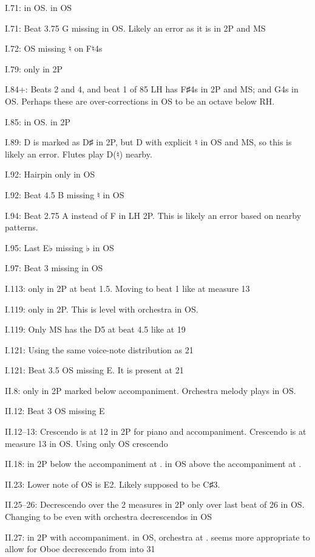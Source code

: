 \documentclass[twoside]{article}
\newcommand\dynmark[1]{\scalebox{0.9}{#1}{\kern1pt}}
\begin{document}
\begin{hangparas}{15pt}{1}
\begin{multicols}{2}
I.71: \dynmark{\p} in OS. \dynmark{\pp} in OS

I.71: Beat 3.75 G missing in OS. Likely an error as it is in 2P and MS

I.72: OS missing ♮ on F♮4s

I.79: \dynmark{\pp} only in 2P

I.84+: Beats 2 and 4, and beat 1 of 85 LH has F♯4s in 2P and MS; and G4s in OS. Perhaps these are over-corrections in OS to be an octave below RH.

I.85: \dynmark{\pp} in OS. \dynmark{\p} in 2P

I.89: D is marked as D♯ in 2P, but D with explicit ♮ in OS and MS, so this is likely an error. Flutes play D(♮) nearby.

I.92: Hairpin only in OS

I.92: Beat 4.5 B missing ♮ in OS

I.94: Beat 2.75 A instead of F in LH 2P. This is likely an error based on nearby patterns.

I.95: Last E♭ missing ♭ in OS

I.97: Beat 3 missing in OS

I.113: \dynmark{\f} only in 2P at beat 1.5. Moving to beat 1 like at measure 13

I.119: \dynmark{\ff} only in 2P. This is level with orchestra in OS.

I.119: Only MS has the D5 at beat 4.5 like at 19

I.121: Using the same voice-note distribution as 21

I.121: Beat 3.5 OS missing E. It is present at 21

II.8: \dynmark{\mf} only in 2P marked below \dynmark{\f} accompaniment. Orchestra melody plays \dynmark{\mezzopiano} in OS.

II.12: Beat 3 OS missing E

II.12--13: Crescendo is at 12 in 2P for piano and accompaniment. Crescendo is at measure 13 in OS. Using only OS crescendo

II.18: \dynmark{\f} in 2P below the accompaniment at \dynmark{\ff}. \dynmark{\ff} in OS above the accompaniment at \dynmark{\f}.

II.23: Lower note of OS is E2. Likely supposed to be C♯3.

II.25--26: Decrescendo over the 2 measures in 2P only over last beat of 26 in OS. Changing to be even with orchestra decrescendos in OS

II.27: \dynmark{\pp} in 2P with \dynmark{\mezzopiano} accompaniment. \dynmark{\p} in OS, orchestra at \dynmark{\p}. \dynmark{\pp} seems more appropriate to allow for Oboe decrescendo from \dynmark{\p} into 31


\end{multicols}
\end{hangparas}
\end{document}
